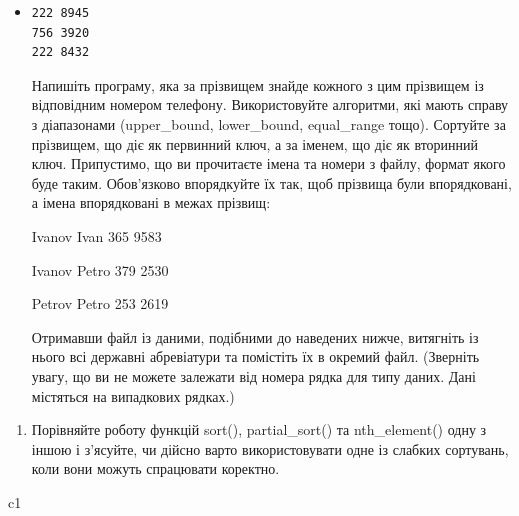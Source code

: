 \documentclass[]{article}
\begin{document}
\begin{itemize}
\item
\begin{verbatim}
222 8945
756 3920
222 8432
\end{verbatim}

  Напишіть програму, яка за прізвищем знайде кожного з цим прізвищем із
  відповідним номером телефону. Використовуйте алгоритми, які мають
  справу з діапазонами (upper\_bound, lower\_bound, equal\_range тощо).
  Сортуйте за прізвищем, що діє як первинний ключ, а за іменем, що діє
  як вторинний ключ. Припустимо, що ви прочитаєте імена та номери з
  файлу, формат якого буде таким. Обов'язково впорядкуйте їх так, щоб
  прізвища були впорядковані, а імена впорядковані в межах прізвищ:

  Ivanov Ivan 365 9583

  Ivanov Petro 379 2530

  Petrov Petro 253 2619

  Отримавши файл із даними, подібними до наведених нижче, витягніть із
  нього всі державні абревіатури та помістіть їх в окремий файл.
  (Зверніть увагу, що ви не можете залежати від номера рядка для типу
  даних. Дані містяться на випадкових рядках.)
\end{itemize}

\begin{enumerate}
\def\labelenumi{\arabic{enumi}.}
\item
  Порівняйте роботу функцій sort(), partial\_sort() та nth\_element()
  одну з іншою і з'ясуйте, чи дійсно варто використовувати одне із
  слабких сортувань, коли вони можуть спрацювати коректно.
\end{enumerate}

c1
\end{document}
